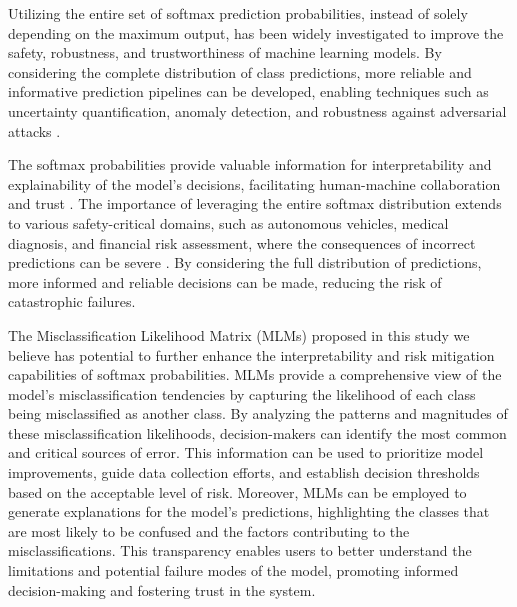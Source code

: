 Utilizing the entire set of softmax prediction probabilities, instead of solely depending on the maximum output, has been widely investigated to improve the safety, robustness, and trustworthiness of machine learning models. By considering the complete distribution of class predictions, more reliable and informative prediction pipelines can be developed, enabling techniques such as uncertainty quantification, anomaly detection, and robustness against adversarial attacks \cite{kendall2017uncertainties, lakshminarayanan2017simple, hendrycks17baseline, goodfellow2014explaining, szegedy2013intriguing}.

The softmax probabilities provide valuable information for interpretability and explainability of the model's decisions, facilitating human-machine collaboration and trust \cite{ribeiro2016should, doshi2017towards}. The importance of leveraging the entire softmax distribution extends to various safety-critical domains, such as autonomous vehicles, medical diagnosis, and financial risk assessment, where the consequences of incorrect predictions can be severe \cite{michelmore2018evaluating, leibig2017leveraging}. By considering the full distribution of predictions, more informed and reliable decisions can be made, reducing the risk of catastrophic failures.

The Misclassification Likelihood Matrix (MLMs) proposed in this study we believe has potential to further enhance the interpretability and risk mitigation capabilities of softmax probabilities. MLMs provide a comprehensive view of the model's misclassification tendencies by capturing the likelihood of each class being misclassified as another class. By analyzing the patterns and magnitudes of these misclassification likelihoods, decision-makers can identify the most common and critical sources of error. This information can be used to prioritize model improvements, guide data collection efforts, and establish decision thresholds based on the acceptable level of risk. Moreover, MLMs can be employed to generate explanations for the model's predictions, highlighting the classes that are most likely to be confused and the factors contributing to the misclassifications. This transparency enables users to better understand the limitations and potential failure modes of the model, promoting informed decision-making and fostering trust in the system.
